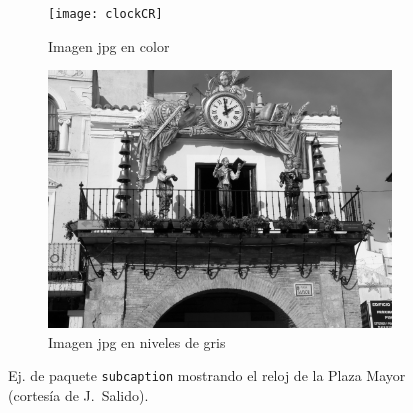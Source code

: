 \documentclass[11pt,a4paper]{article}
\begin{document}
\begin{figure}[hbt]
	\centering
	\begin{subfigure}[b]{0.48\textwidth}
		\centering
		\texttt{[image: clockCR]}
		\caption{Imagen jpg en color}\label{fig:clockCR}
	\end{subfigure}
	\begin{subfigure}[b]{0.48\textwidth}
		\centering
		\includegraphics[width=\textwidth]{clockCRbw}
		\caption{Imagen jpg en niveles de gris}\label{fig:clockCRbw}
	\end{subfigure}
	\caption[Comparación jpg color y niveles de gris]{Ej. de paquete \texttt{subcaption} mostrando el reloj de la Plaza Mayor (cortesía de J.~Salido).}
	\label{fig:clock}
\end{figure}
\end{document}
